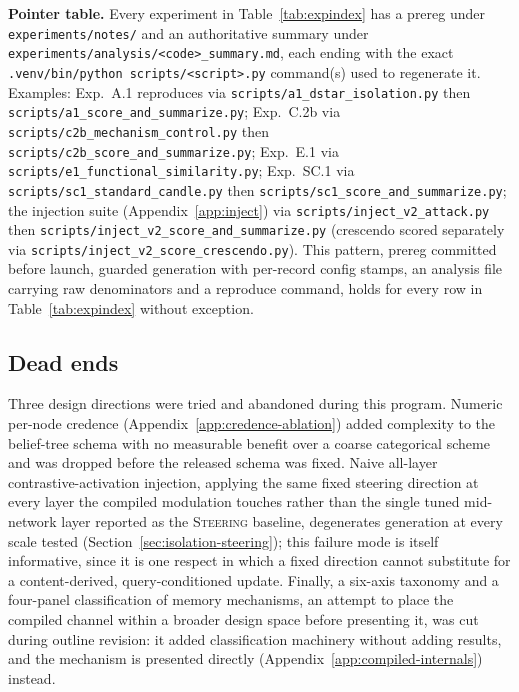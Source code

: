 \textbf{Pointer table.} Every experiment in Table~\ref{tab:expindex} has a prereg under
\texttt{experiments/notes/} and an authoritative summary under
\texttt{experiments/analysis/<code>\_summary.md}, each ending with the exact
\texttt{.venv/bin/python scripts/<script>.py} command(s) used to regenerate it. Examples:
Exp.~A.1 reproduces via \texttt{scripts/a1\_dstar\_isolation.py} then
\texttt{scripts/a1\_score\_and\_summarize.py}; Exp.~C.2b via
\texttt{scripts/c2b\_mechanism\_control.py} then \texttt{scripts/c2b\_score\_and\_summarize.py};
Exp.~E.1 via \texttt{scripts/e1\_functional\_similarity.py}; Exp.~SC.1 via
\texttt{scripts/sc1\_standard\_candle.py} then \texttt{scripts/sc1\_score\_and\_summarize.py};
the injection suite (Appendix~\ref{app:inject}) via \texttt{scripts/inject\_v2\_attack.py}
then \texttt{scripts/inject\_v2\_score\_and\_summarize.py} (crescendo scored separately via
\texttt{scripts/inject\_v2\_score\_crescendo.py}). This pattern, prereg committed before
launch, guarded generation with per-record config stamps, an analysis file carrying raw
denominators and a reproduce command, holds for every row in Table~\ref{tab:expindex}
without exception.

\subsection{Dead ends}
\label{app:deadends}

Three design directions were tried and abandoned during this program. Numeric
per-node credence (Appendix~\ref{app:credence-ablation}) added complexity to the
belief-tree schema with no measurable benefit over a coarse categorical scheme and was
dropped before the released schema was fixed. Naive all-layer contrastive-activation
injection, applying the same fixed steering direction at every layer the compiled
modulation touches rather than the single tuned mid-network layer reported as the
\textsc{Steering} baseline, degenerates generation at every scale tested
(Section~\ref{sec:isolation-steering}); this failure mode is itself informative, since
it is one respect in which a fixed direction cannot substitute for a content-derived,
query-conditioned update. Finally, a six-axis taxonomy and a four-panel classification of
memory mechanisms, an attempt to place the compiled channel within a broader design
space before presenting it, was cut during outline revision: it added classification
machinery without adding results, and the mechanism is presented directly
(Appendix~\ref{app:compiled-internals}) instead.
